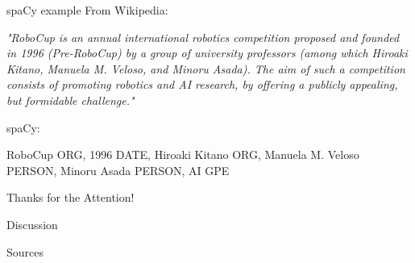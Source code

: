 \documentclass{beamer}
\begin{document}
	\begin{frame}{spaCy example}
		From Wikipedia:
		
		\emph{"RoboCup is an annual international robotics competition proposed and founded in 1996 (Pre-RoboCup) by a group of university professors (among which Hiroaki Kitano, Manuela M. Veloso, and Minoru Asada). The aim of such a competition consists of promoting robotics and AI research, by offering a publicly appealing, but formidable challenge."}
		\pause
		
		spaCy:
		
		RoboCup ORG,
		1996 DATE,
		Hiroaki Kitano ORG,
		Manuela M. Veloso PERSON,
		Minoru Asada PERSON,
		AI GPE
	\end{frame}
	
	\begin{frame}{}
		Thanks for the Attention!
	\end{frame}
	
	\begin{frame}{}
		Discussion
	\end{frame}
	
	
	\begin{frame}{Sources}
		
		
	\end{frame}
	
\end{document}
